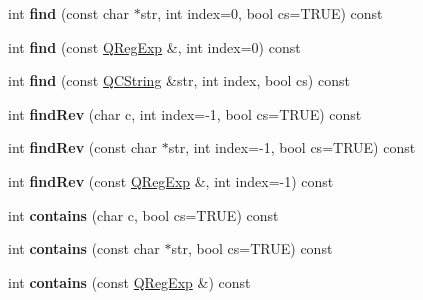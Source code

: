 \begin{DoxyCompactItemize}
\item 
\hypertarget{class_s_c_string_ae601972d1298a1aa17a9d2985fad64cc}{int {\bfseries find} (const char $\ast$str, int index=0, bool cs=T\-R\-U\-E) const }\label{class_s_c_string_ae601972d1298a1aa17a9d2985fad64cc}

\item 
\hypertarget{class_s_c_string_a7d7d4fe2b8d9279521d5b89fbde1052d}{int {\bfseries find} (const \hyperlink{class_q_reg_exp}{Q\-Reg\-Exp} \&, int index=0) const }\label{class_s_c_string_a7d7d4fe2b8d9279521d5b89fbde1052d}

\item 
\hypertarget{class_s_c_string_a791ea1fc0ebbceedc0bf751f2b790fb1}{int {\bfseries find} (const \hyperlink{class_q_c_string}{Q\-C\-String} \&str, int index, bool cs) const }\label{class_s_c_string_a791ea1fc0ebbceedc0bf751f2b790fb1}

\item 
\hypertarget{class_s_c_string_a1c9c5fa7edcc9f59b7ad419554a31270}{int {\bfseries find\-Rev} (char c, int index=-\/1, bool cs=T\-R\-U\-E) const }\label{class_s_c_string_a1c9c5fa7edcc9f59b7ad419554a31270}

\item 
\hypertarget{class_s_c_string_aae624bd3ceb0e99a50f3145450c9657b}{int {\bfseries find\-Rev} (const char $\ast$str, int index=-\/1, bool cs=T\-R\-U\-E) const }\label{class_s_c_string_aae624bd3ceb0e99a50f3145450c9657b}

\item 
\hypertarget{class_s_c_string_ac8a7fd641cbd6e1d9704c2a37547f7dd}{int {\bfseries find\-Rev} (const \hyperlink{class_q_reg_exp}{Q\-Reg\-Exp} \&, int index=-\/1) const }\label{class_s_c_string_ac8a7fd641cbd6e1d9704c2a37547f7dd}

\item 
\hypertarget{class_s_c_string_a2ff9ac285923aa8c6f798a030730b80d}{int {\bfseries contains} (char c, bool cs=T\-R\-U\-E) const }\label{class_s_c_string_a2ff9ac285923aa8c6f798a030730b80d}

\item 
\hypertarget{class_s_c_string_abe7452ce01e2396702f7f158ebf38d22}{int {\bfseries contains} (const char $\ast$str, bool cs=T\-R\-U\-E) const }\label{class_s_c_string_abe7452ce01e2396702f7f158ebf38d22}

\item 
\hypertarget{class_s_c_string_aedd4a9c1e1ccbd48eec982dd9e6abb44}{int {\bfseries contains} (const \hyperlink{class_q_reg_exp}{Q\-Reg\-Exp} \&) const }\label{class_s_c_string_aedd4a9c1e1ccbd48eec982dd9e6abb44}


\end{DoxyCompactItemize}
